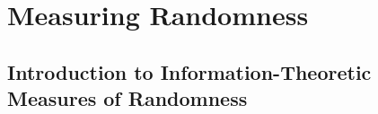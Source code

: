 \documentclass[6008notes.tex]{subfiles}
\begin{document}
\graphicspath{ {images/measrand/} }

\section{Measuring Randomness}

\subsection{Introduction to Information-Theoretic Measures of Randomness}
\end{document}
